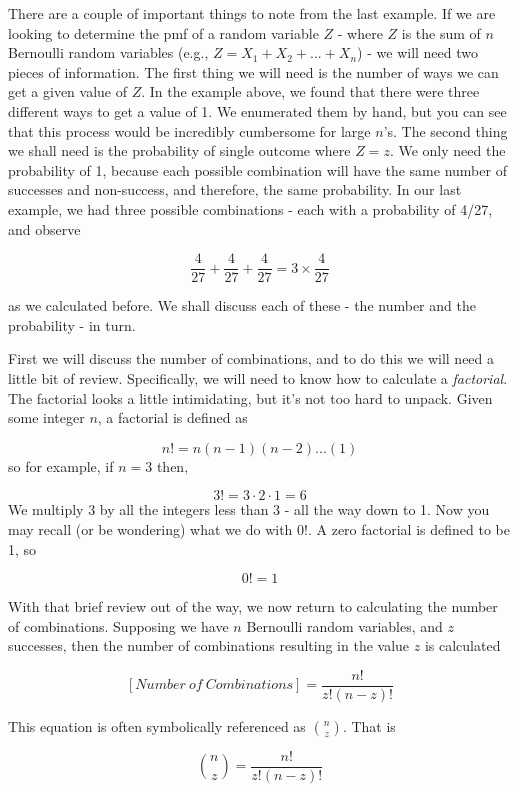 \documentclass[
]{book}
\theoremstyle{definition}
\theoremstyle{definition}
\theoremstyle{definition}
\theoremstyle{definition}
\theoremstyle{remark}
\begin{document}
There are a couple of important things to note from the last example. If we are looking to determine the pmf of a random variable \(Z\) - where \(Z\) is the sum of \(n\) Bernoulli random variables (e.g., \(Z = X_1 + X_2 +...+X_n\)) - we will need two pieces of information. The first thing we will need is the number of ways we can get a given value of \(Z\). In the example above, we found that there were three different ways to get a value of 1. We enumerated them by hand, but you can see that this process would be incredibly cumbersome for large \(n\)'s. The second thing we shall need is the probability of single outcome where \(Z=z\). We only need the probability of 1, because each possible combination will have the same number of successes and non-success, and therefore, the same probability. In our last example, we had three possible combinations - each with a probability of 4/27, and observe

\[
\frac{4}{27} + \frac{4}{27} + \frac{4}{27} = 3\times\frac{4}{27} 
\]

as we calculated before. We shall discuss each of these - the number and the probability - in turn.

First we will discuss the number of combinations, and to do this we will need a little bit of review. Specifically, we will need to know how to calculate a \emph{factorial}. The factorial looks a little intimidating, but it's not too hard to unpack. Given some integer \(n\), a factorial is defined as

\[
n! = n(n-1)(n-2)...(1)
\]
so for example, if \(n = 3\) then,

\[
3! = 3\cdot2\cdot1 = 6
\]
We multiply \(3\) by all the integers less than \(3\) - all the way down to 1. Now you may recall (or be wondering) what we do with \(0!\). A zero factorial is defined to be 1, so

\[
0! = 1
\]

With that brief review out of the way, we now return to calculating the number of combinations. Supposing we have \(n\) Bernoulli random variables, and \(z\) successes, then the number of combinations resulting in the value \(z\) is calculated

\[
[Number\: of \: Combinations]=\frac{n!}{z!(n-z)!}
\]

This equation is often symbolically referenced as \({n \choose z}\). That is

\[
{n \choose z} = \frac{n!}{z!(n-z)!}
\label{eq:nchoosez}
\]
\end{document}
